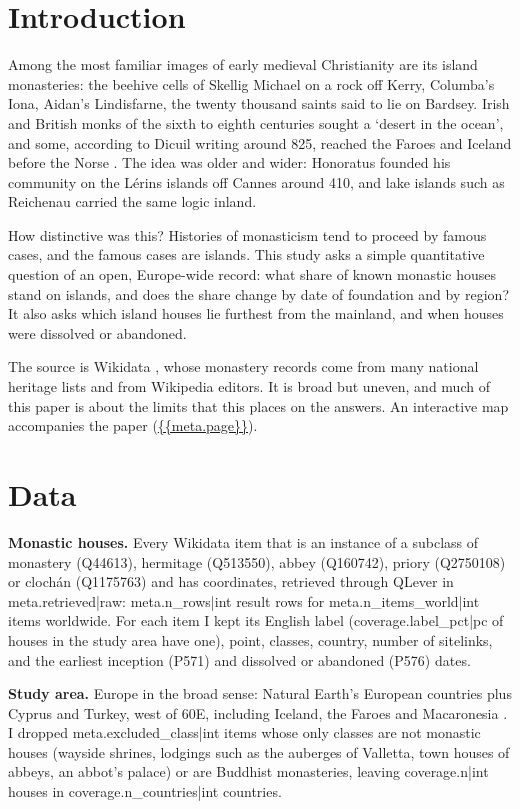 \documentclass[11pt,a4paper]{article}
\begin{document}
\section{Introduction}
Among the most familiar images of early medieval Christianity are its island monasteries: the beehive cells of Skellig Michael on a rock off Kerry, Columba's Iona, Aidan's Lindisfarne, the twenty thousand saints said to lie on Bardsey. Irish and British monks of the sixth to eighth centuries sought a `desert in the ocean', and some, according to Dicuil writing around 825, reached the Faroes and Iceland before the Norse \citep{dicuil}. The idea was older and wider: Honoratus founded his community on the Lérins islands off Cannes around 410, and lake islands such as Reichenau carried the same logic inland.

How distinctive was this? Histories of monasticism tend to proceed by famous cases, and the famous cases are islands. This study asks a simple quantitative question of an open, Europe-wide record: what share of known monastic houses stand on islands, and does the share change by date of foundation and by region? It also asks which island houses lie furthest from the mainland, and when houses were dissolved or abandoned.

The source is Wikidata \citep{wikidata}, whose monastery records come from many national heritage lists and from Wikipedia editors. It is broad but uneven, and much of this paper is about the limits that this places on the answers. An interactive map accompanies the paper (\url{{{meta.page}}}).

\section{Data}
\textbf{Monastic houses.} Every Wikidata item that is an instance of a subclass of monastery (Q44613), hermitage (Q513550), abbey (Q160742), priory (Q2750108) or clochán (Q1175763) and has coordinates, retrieved through QLever \citep{qlever} in {{meta.retrieved|raw}}: {{meta.n_rows|int}} result rows for {{meta.n_items_world|int}} items worldwide. For each item I kept its English label ({{coverage.label_pct|pc}} of houses in the study area have one), point, classes, country, number of sitelinks, and the earliest inception (P571) and dissolved or abandoned (P576) dates.

\textbf{Study area.} Europe in the broad sense: Natural Earth's European countries plus Cyprus and Turkey, west of 60\textdegree{}E, including Iceland, the Faroes and Macaronesia \citep{naturalearth}. I dropped {{meta.excluded_class|int}} items whose only classes are not monastic houses (wayside shrines, lodgings such as the auberges of Valletta, town houses of abbeys, an abbot's palace) or are Buddhist monasteries, leaving {{coverage.n|int}} houses in {{coverage.n_countries|int}} countries.
\end{document}
